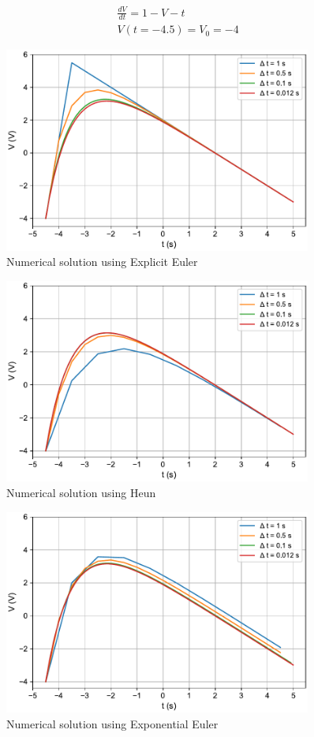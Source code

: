 \documentclass{scrartcl}
\begin{document}
\begin{align}
	\label{eq:ivp}
	&\frac{dV}{dt} = 1- V - t \\
		&V(t=-4.5) = V_0 = -4 \nonumber
\end{align}

\begin{figure}[h]
	\centering
	\includegraphics[width=0.9\textwidth]{figures/explicit_euler.pdf}
	\caption{Numerical solution using Explicit Euler}
	\label{fig:explicit_euler}
\end{figure}
\begin{figure}[h!]
	\centering
	\includegraphics[width=0.9\textwidth]{figures/heun.pdf}
	\caption{Numerical solution using Heun}
	\label{fig:heun}
\end{figure}
\begin{figure}[h!]
	\centering
	\includegraphics[width=0.9\textwidth]{figures/exponential_euler.pdf}
	\caption{Numerical solution using Exponential Euler}
	\label{fig:exponential_euler}
\end{figure}
\end{document}
